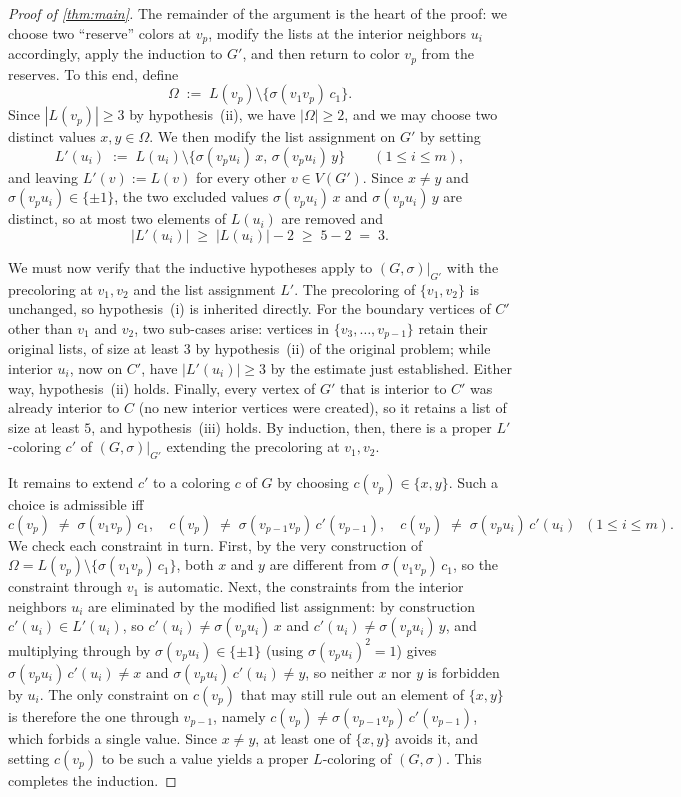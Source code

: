 \documentclass[10pt,a4paper]{amsart}
\newcommand{\Gs}{(G,\sigma)}
\newcommand{\V}{V}
\begin{document}
\begin{proof}[Proof of \cref{thm:main}]
The remainder of the argument is the heart of the proof: we choose
two ``reserve'' colors at $v_p$, modify the lists at the interior
neighbors $u_i$ accordingly, apply the induction to $G'$, and then
return to color $v_p$ from the reserves. To this end, define
\[
   \Omega\;:=\;L(v_p)\setminus\{\sigma(v_1v_p)\,c_1\}.
\]
Since $|L(v_p)|\ge 3$ by hypothesis~(ii), we have $|\Omega|\ge 2$,
and we may choose two distinct values $x,y\in\Omega$. We then
modify the list assignment on $G'$ by setting
\[
   L'(u_i) \;:=\; L(u_i)\setminus\{\sigma(v_pu_i)\,x,\,\sigma(v_pu_i)\,y\}
   \qquad (1\le i\le m),
\]
and leaving $L'(v):=L(v)$ for every other $v\in\V(G')$. Since
$x\ne y$ and $\sigma(v_pu_i)\in\{\pm1\}$, the two excluded values
$\sigma(v_pu_i)\,x$ and $\sigma(v_pu_i)\,y$ are distinct, so at most
two elements of $L(u_i)$ are removed and
\[
   |L'(u_i)|\;\ge\;|L(u_i)|-2\;\ge\;5-2\;=\;3.
\]

We must now verify that the inductive hypotheses apply to
$\Gs|_{G'}$ with the precoloring at $v_1,v_2$ and the list
assignment $L'$. The precoloring of $\{v_1,v_2\}$ is unchanged, so
hypothesis~(i) is inherited directly. For the boundary vertices of
$C'$ other than $v_1$ and $v_2$, two sub-cases arise: vertices in
$\{v_3,\dots,v_{p-1}\}$ retain their original lists, of size at
least $3$ by hypothesis~(ii) of the original problem; while
interior $u_i$, now on $C'$, have $|L'(u_i)|\ge 3$ by the estimate
just established. Either way, hypothesis~(ii) holds. Finally, every
vertex of $G'$ that is interior to $C'$ was already interior to $C$
(no new interior vertices were created), so it retains a list of
size at least $5$, and hypothesis~(iii) holds. By induction, then,
there is a proper $L'$-coloring $c'$ of $\Gs|_{G'}$ extending the
precoloring at $v_1,v_2$.

It remains to extend $c'$ to a coloring $c$ of $G$ by choosing
$c(v_p)\in\{x,y\}$. Such a choice is admissible iff
\[
c(v_p)\;\ne\;\sigma(v_1v_p)\,c_1,\quad
c(v_p)\;\ne\;\sigma(v_{p-1}v_p)\,c'(v_{p-1}),\quad
c(v_p)\;\ne\;\sigma(v_pu_i)\,c'(u_i)\;\;(1\le i\le m).
\]
We check each constraint in turn. First, by the very construction
of $\Omega=L(v_p)\setminus\{\sigma(v_1v_p)\,c_1\}$, both $x$ and
$y$ are different from $\sigma(v_1v_p)\,c_1$, so the constraint
through $v_1$ is automatic. Next, the constraints from the interior
neighbors $u_i$ are eliminated by the modified list assignment: by
construction $c'(u_i)\in L'(u_i)$, so
$c'(u_i)\ne\sigma(v_pu_i)\,x$ and $c'(u_i)\ne\sigma(v_pu_i)\,y$,
and multiplying through by $\sigma(v_pu_i)\in\{\pm1\}$ (using
$\sigma(v_pu_i)^2=1$) gives $\sigma(v_pu_i)\,c'(u_i)\ne x$ and
$\sigma(v_pu_i)\,c'(u_i)\ne y$, so neither $x$ nor $y$ is forbidden
by $u_i$. The only constraint on $c(v_p)$ that may still rule out
an element of $\{x,y\}$ is therefore the one through $v_{p-1}$,
namely $c(v_p)\ne\sigma(v_{p-1}v_p)\,c'(v_{p-1})$, which forbids a
single value. Since $x\ne y$, at least one of $\{x,y\}$ avoids it,
and setting $c(v_p)$ to be such a value yields a proper $L$-coloring
of $\Gs$. This completes the induction.
\end{proof}
\end{document}
